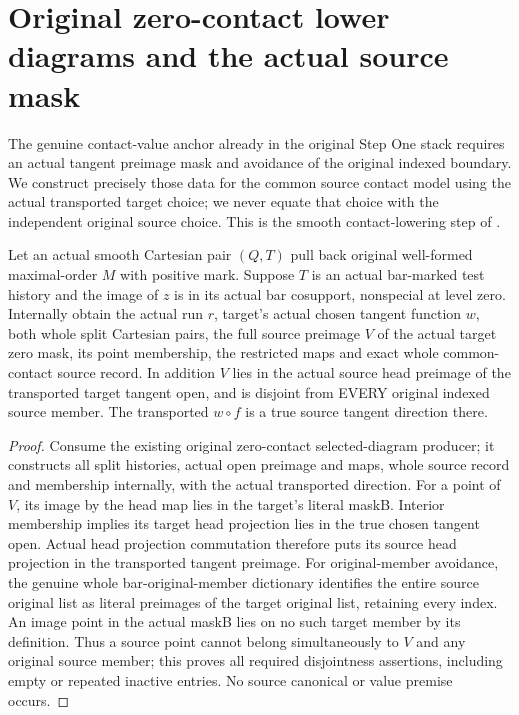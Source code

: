 \section{Original zero-contact lower diagrams and the actual source mask}

The genuine contact-value anchor already in the original Step One stack
requires an actual tangent preimage mask and avoidance of the original
indexed boundary. We construct precisely those data for the common source
contact model using the actual transported target choice; we never equate
that choice with the independent original source choice.
This is the smooth contact-lowering step of
\cite{wlodarczyk05-hironaka,bierstone-milman08-functoriality}.

\begin{theorem}
\label{hir:smooth-original-zero-contact-common-mask-geometry}
\leanok
{}
Let an actual smooth Cartesian pair $(Q,T)$ pull back original well-formed
maximal-order $M$ with positive mark. Suppose $T$ is an actual bar-marked
test history and the image of $z$ is in its actual bar cosupport, nonspecial
at level zero. Internally obtain the actual run $r$, target's actual chosen
tangent function $w$, both whole split Cartesian pairs, the full source
preimage $V$ of the actual target zero mask, its point membership, the
restricted maps and exact whole common-contact source record. In addition
$V$ lies in the actual source head preimage of the transported target
tangent open, and is disjoint from EVERY original indexed source member.
The transported $w\circ f$ is a true source tangent direction there.
\end{theorem}
\begin{proof}
Consume the existing original zero-contact selected-diagram producer; it
constructs all split histories, actual open preimage and maps, whole source
record and membership internally, with the actual transported direction.
For a point of $V$, its image by the head map lies in the target's literal
maskB. Interior membership implies its target head projection lies in
the true chosen tangent open. Actual head projection commutation therefore
puts its source head projection in the transported tangent preimage.
For original-member avoidance, the genuine whole bar-original-member
dictionary identifies the entire source original list as literal
preimages of the target original list, retaining every index. An image
point in the actual maskB lies on no such target member by its definition.
Thus a source point cannot belong simultaneously to $V$ and any original
source member; this proves all required disjointness assertions, including
empty or repeated inactive entries. No source canonical or value premise
occurs.
\end{proof}


